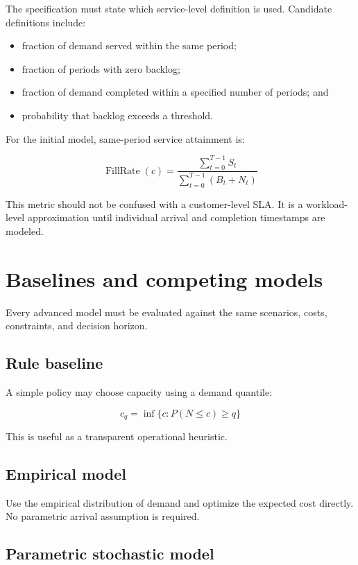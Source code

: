 \documentclass[11pt,a4paper]{article}
\newcommand{\equationnote}[1]{\begin{center}\colorbox{boxblue}{\parbox{0.92\linewidth}{\begin{equation*}#1\end{equation*}}}\end{center}}
\begin{document}
The specification must state which service-level definition is used. Candidate definitions include:
\begin{itemize}
  \item fraction of demand served within the same period;
  \item fraction of periods with zero backlog;
  \item fraction of demand completed within a specified number of periods; and
  \item probability that backlog exceeds a threshold.
\end{itemize}

For the initial model, same-period service attainment is:

\equationnote{\operatorname{FillRate}(c) = \frac{\sum_{t=0}^{T-1} S_t}{\sum_{t=0}^{T-1}(B_t+N_t)}}

This metric should not be confused with a customer-level SLA. It is a workload-level approximation until individual arrival and completion timestamps are modeled.

\section{Baselines and competing models}

Every advanced model must be evaluated against the same scenarios, costs, constraints, and decision horizon.

\subsection{Rule baseline}

A simple policy may choose capacity using a demand quantile:

\equationnote{c_q = \inf\{c : P(N \leq c) \geq q\}}

This is useful as a transparent operational heuristic.

\subsection{Empirical model}

Use the empirical distribution of demand and optimize the expected cost directly. No parametric arrival assumption is required.

\subsection{Parametric stochastic model}
\end{document}
